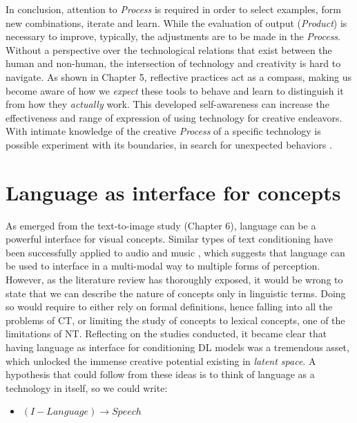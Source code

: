 In conclusion, attention to \emph{Process} is required in order to select examples, form new combinations, iterate and learn. While the evaluation of output (\emph{Product}) is necessary to improve, typically, the adjustments are to be made in the \emph{Process}. Without a perspective over the technological relations that exist between the human and non-human, the intersection of technology and creativity is hard to navigate. As shown in Chapter 5, reflective practices act as a compass, making us become aware of how we \emph{expect} these tools to behave and learn to distinguish it from how they \emph{actually} work. This developed self-awareness can increase the effectiveness and range of expression of using technology for creative endeavors.
With intimate knowledge of the creative \emph{Process} of a specific technology is possible experiment with its boundaries, in search for unexpected behaviors \citep{Hoorn2023}.
 
\section{Language as interface for concepts}\label{sec:language-as-interface-for-concepts}

As emerged from the text-to-image study (Chapter 6), language can be a powerful interface for visual concepts. Similar types of text conditioning have been successfully applied to audio \citep{Borsos2022,Huang2023,Liu2023,Huang2023a,Dong2023,Ghosal2023} and music \citep{Agostinelli2023,Schneider2023,Chen2023,Melechovsky2023}, which suggests that language can be used to interface in a multi-modal way to multiple forms of perception. However, as the literature review has thoroughly exposed, it would be wrong to state that we can describe the nature of concepts only in linguistic terms. Doing so would require to either rely on formal definitions, hence falling into all the problems of CT, or limiting the study of concepts to lexical concepts, one of the limitations of NT. Reflecting on the studies conducted, it became clear that having language as interface for conditioning DL models was a tremendous asset, which unlocked the immense creative potential existing in \emph{latent space}. A hypothesis that could follow from these ideas is to think of language as a technology in itself, so we could write:

\begin{itemize}
	\singlespacing
	\item $ (I - Language) \rightarrow Speech $
\end{itemize}


